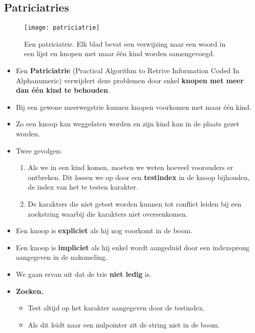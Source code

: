 \subsection{Patriciatries}
\begin{figure}[ht]
    \centering
    \texttt{[image: patriciatrie]}
    \caption{Een patriciatrie. Elk blad bevat een verwijzing naar een woord in een lijst en knopen met maar één kind worden samengevoegd.}
    \label{fig:patriciatrie}
\end{figure}
\begin{itemize}
    \alert Veel trieknopen hebben maar één kind zodat er veel ongebruikt geheugen is.
    \alert Er zijn ook twee soorten knoopen: inwendige knoop zonder sleutel maar met wijzers naar kinderen, en bladeren met sleutel maar zonder wijzers naar kinderen.
    \item Een \textbf{Patriciatrie} (Practical Algorithm to Retrive Information Coded In Alphanumeric) verwijdert deze problemen door enkel \textbf{knopen met meer dan één kind te behouden}.
    \item Bij een gewone meerwegstrie kunnen knopen voorkomen met maar één kind.
    \item Zo een knoop kan weggelaten worden en zijn kind kan in de plaats gezet worden.
    \item Twee gevolgen:
    \begin{enumerate}
        \item Als we in een kind komen, moeten we weten hoeveel voorouders er ontbreken. Dit lossen we op door een \textbf{testindex} in de knoop bijhouden, de index van het te testen karakter.
        \item De karakters die niet getest worden kunnen tot conflict leiden bij een zoekstring waarbij die karakters niet overeenkomen.
    \end{enumerate}
    \item Een knoop is \textbf{expliciet} als hij nog voorkomt in de boom.
    \item Een knoop is \textbf{impliciet} als hij enkel wordt aangeduid door een indexsprong aangegeven in de nakomeling.
    \item We gaan ervan uit dat de trie \textbf{niet ledig} is.
    \item \textbf{Zoeken.}
    \begin{itemize}
        \item Test altijd op het karakter aangegeven door de testindex.
        \item Als dit leidt naar een nulpointer zit de string niet in de boom.

\end{itemize}
\end{itemize}
